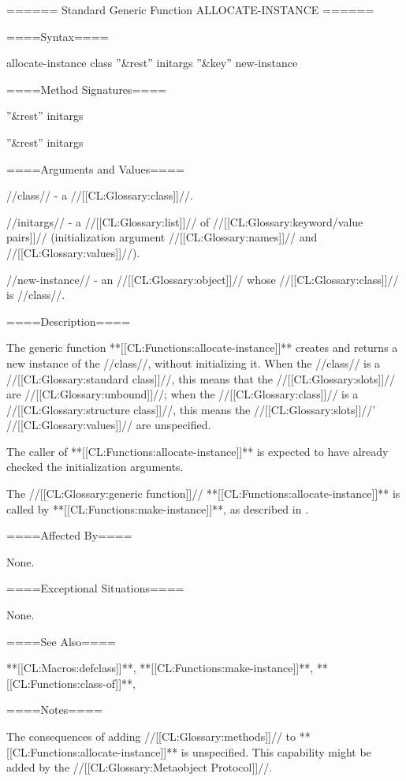 ====== Standard Generic Function ALLOCATE-INSTANCE ======


====Syntax====

\DefgenWithValues allocate-instance {class ''&rest'' initargs ''&key'' {\allowotherkeys}} {new-instance}

====Method Signatures====

 { ''&rest'' initargs}

 { ''&rest'' initargs}

====Arguments and Values====

//class// - a //[[CL:Glossary:class]]//.

//initargs// - a //[[CL:Glossary:list]]// of //[[CL:Glossary:keyword/value pairs]]// (initialization argument //[[CL:Glossary:names]]// and //[[CL:Glossary:values]]//).

//new-instance// - an //[[CL:Glossary:object]]// whose //[[CL:Glossary:class]]// is //class//.

====Description====

The generic function **[[CL:Functions:allocate-instance]]** creates and returns a new instance of the //class//, without initializing it. When the //class// is a //[[CL:Glossary:standard class]]//, this means that the //[[CL:Glossary:slots]]// are //[[CL:Glossary:unbound]]//; when the //[[CL:Glossary:class]]// is a //[[CL:Glossary:structure class]]//, this means the //[[CL:Glossary:slots]]//' //[[CL:Glossary:values]]// are unspecified.

The caller of **[[CL:Functions:allocate-instance]]** is expected to have already checked the initialization arguments.

The //[[CL:Glossary:generic function]]// **[[CL:Functions:allocate-instance]]** is called by **[[CL:Functions:make-instance]]**, as described in \secref\ObjectCreationAndInit.

====Affected By====

None.

====Exceptional Situations====

None.

====See Also====

**[[CL:Macros:defclass]]**, **[[CL:Functions:make-instance]]**, **[[CL:Functions:class-of]]**, {\secref\ObjectCreationAndInit}

====Notes====

The consequences of adding //[[CL:Glossary:methods]]// to **[[CL:Functions:allocate-instance]]** is unspecified. This capability might be added by the //[[CL:Glossary:Metaobject Protocol]]//.

 
